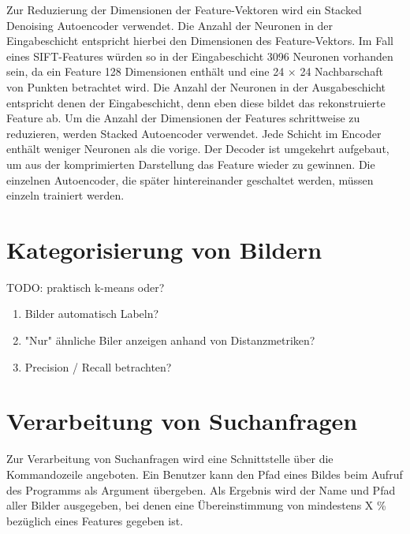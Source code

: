Zur Reduzierung der Dimensionen der Feature-Vektoren wird ein Stacked Denoising Autoencoder verwendet. Die Anzahl der Neuronen in der Eingabeschicht entspricht hierbei den Dimensionen des Feature-Vektors. Im Fall eines SIFT-Features würden so in der Eingabeschicht 3096 Neuronen vorhanden sein, da ein Feature 128 Dimensionen enthält und eine 24 $\times$ 24 Nachbarschaft von Punkten betrachtet wird. Die Anzahl der Neuronen in der Ausgabeschicht entspricht denen der Eingabeschicht, denn eben diese bildet das rekonstruierte Feature ab. Um die Anzahl der Dimensionen der Features schrittweise zu reduzieren, werden Stacked Autoencoder verwendet. Jede Schicht im Encoder enthält weniger Neuronen als die vorige. Der Decoder ist umgekehrt aufgebaut, um aus der komprimierten Darstellung das Feature wieder zu gewinnen. Die einzelnen Autoencoder, die später hintereinander geschaltet werden, müssen einzeln trainiert werden.

\section{Kategorisierung von Bildern}

TODO: praktisch k-means oder?

\begin{enumerate}
	\item Bilder automatisch Labeln?
	\item "Nur" ähnliche Biler anzeigen anhand von Distanzmetriken?
	\item Precision / Recall betrachten?
\end{enumerate}

\section{Verarbeitung von Suchanfragen}

Zur Verarbeitung von Suchanfragen wird eine Schnittstelle über die Kommandozeile angeboten. Ein Benutzer kann den Pfad eines Bildes beim Aufruf des Programms als Argument übergeben. Als Ergebnis wird der Name und Pfad aller Bilder ausgegeben, bei denen eine Übereinstimmung von mindestens X \% bezüglich eines Features gegeben ist.